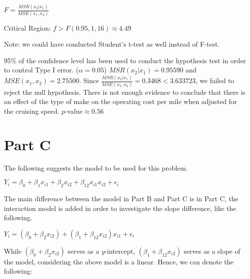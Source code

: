 \documentclass[letterpaper]{article}
\begin{document}
\begin{center}
$F = \frac{MSR(x_2|x_1)}{MSE(x_1, x_2)}$

Critical Region: $f > F(0.95, 1, 16) \approx 4.49$
\end{center}

\begin{flushleft}
Note: we could have conducted Student's t-test as well instead of F-test.
\end{flushleft}

\begin{flushleft}
95\% of the confidence level has been used to conduct the hypothesis test in order to control Type I error. ($\alpha = 0.05$) $MSR(x_2|x_1) = 0.95590$ and $MSE(x_1, x_2) = 2.75500$. Since $\frac{MSR(x_2|x_1)}{MSE(x_1, x_2)} = 0.3468 < 3.633723$, we failed to reject the null hypothesis. There is not enough evidence to conclude that there is an effect of the type of make on the operating cost per mile when adjusted for the cruising speed. $p$-value$ \approx 0.56$
\end{flushleft}


\section{Part C}
\begin{flushleft}
The following suggests the model to be used for this problem.
\end{flushleft}

\begin{center}
$Y_i = \beta_0 + \beta_1x_{i1} + \beta_2x_{i2} + \beta_{12}x_{i1}x_{i2} + \epsilon_i$
\end{center}

\begin{flushleft}
The main difference between the model in Part B and Part C is in Part C, the interaction model is added in order to investigate the slope difference, like the following.
\end{flushleft}

\begin{center}
$Y_i = (\beta_0 + \beta_2x_{i2}) + (\beta_1 + \beta_{12}x_{i2})x_{i1} + \epsilon_i$
\end{center}

\begin{flushleft}
While $(\beta_0 + \beta_2x_{i2})$ serves as a $y$-intercept, $(\beta_1+\beta_{12}x_{i2})$ serves as a slope of the model, considering the above model is a linear. Hence, we can denote the following:
\end{flushleft}
\end{document}
